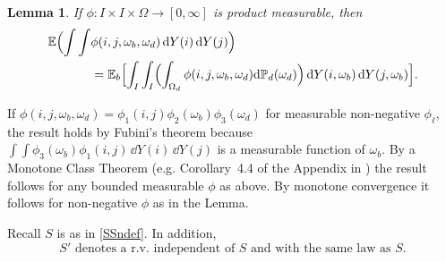 \documentclass[12pt]{article}
\makeatletter
\renewenvironment{proof}[1][\proofname]{%
\par\pushQED{\qed}\normalfont%
\topsep6\p@\@plus6\p@\relax
\trivlist\item[\hskip\labelsep\bfseries#1\@addpunct{.}]%
\ignorespaces
}{%
\popQED\endtrivlist\@endpefalse
}
\numberwithin{theorem}{section}
\newtheorem{lemma}[theorem]{Lemma}
\theoremstyle{def}
\numberwithin{equation}{section}
\renewcommand{\P}{\mathbb{P}}
\newcommand{\E}{\mathbb{E}}
\makeatother
\begin{document}
\begin{lemma}\label{Fubini}If $\phi:I\times I\times\Omega\to[0,\infty]$ is product measurable, then
\begin{align*}\E\Bigl(\int\int &\phi(i,j,\omega_b,\omega_d)\,\dd Y(i)\,\dd Y(j)\Bigr)\\
&=\E_b\Bigl[\int_I\int_I\Bigl(\int_{\Omega_d}\phi(i,j,\omega_b,\omega_d)\dd\P_d(\omega_d)\Bigr)\,\dd Y(i,\omega_b)\,\dd Y(j,\omega_b)\Bigr].
\end{align*}
\end{lemma}
\begin{proof} If $\phi(i,j,\omega_b,\omega_d)=\phi_1(i,j)\phi_2(\omega_b)\phi_3(\omega_d)$ for measurable non-negative $\phi_\ell$, the result holds by Fubini's theorem because $\int\int\phi_3(\omega_b)\phi_1(i,j)\,\dd Y(i)\,\dd Y(j)$ is a measurable function of $\omega_b$.  By a Monotone Class Theorem (e.g. Corollary~4.4 of the Appendix in \cite{EK}) the result follows for any bounded measurable $\phi$ as above.  By monotone convergence it follows for non-negative $\phi$ as in the Lemma.
\end{proof}

Recall $S$ is as in \eqref{SSndef}.  
In addition,
\begin{equation}\label{S'def}
S'\text{ denotes a r.v.\ independent of $S$ and with the same law as $S$}.
\end{equation}
\end{document}
